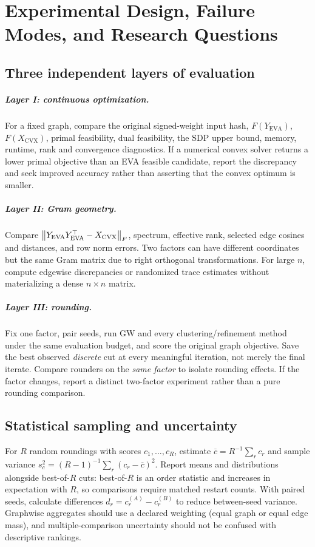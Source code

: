 \chapter{Experimental Design, Failure Modes, and Research Questions}\label{ch:protocol}
\section{Three independent layers of evaluation}
\paragraph{Layer I: continuous optimization.} For a fixed graph, compare the original signed-weight input hash, $F(Y_{\mathrm{EVA}})$, $F(X_{\mathrm{CVX}})$, primal feasibility, dual feasibility, the SDP upper bound, memory, runtime, rank and convergence diagnostics. If a numerical convex solver returns a lower primal objective than an EVA feasible candidate, report the discrepancy and seek improved accuracy rather than asserting that the convex optimum is smaller.

\paragraph{Layer II: Gram geometry.} Compare $\left\lVert Y_{\mathrm{EVA}}Y_{\mathrm{EVA}}^\top-X_{\mathrm{CVX}}\right\rVert_F$, spectrum, effective rank, selected edge cosines and distances, and row norm errors. Two factors can have different coordinates but the same Gram matrix due to right orthogonal transformations. For large $n$, compute edgewise discrepancies or randomized trace estimates without materializing a dense $n\times n$ matrix.

\paragraph{Layer III: rounding.} Fix one factor, pair seeds, run GW and every clustering/refinement method under the same evaluation budget, and score the original graph objective. Save the best observed \emph{discrete} cut at every meaningful iteration, not merely the final iterate. Compare rounders on the \emph{same factor} to isolate rounding effects. If the factor changes, report a distinct two-factor experiment rather than a pure rounding comparison.

\section{Statistical sampling and uncertainty}
For $R$ random roundings with scores $c_1,\ldots,c_R$, estimate $\overline c=R^{-1}\sum_rc_r$ and sample variance $s_c^2=(R-1)^{-1}\sum_r(c_r-\overline c)^2$. Report means and distributions alongside best-of-$R$ cuts: best-of-$R$ is an order statistic and increases in expectation with $R$, so comparisons require matched restart counts. With paired seeds, calculate differences $d_r=c_r^{(A)}-c_r^{(B)}$ to reduce between-seed variance. Graphwise aggregates should use a declared weighting (equal graph or equal edge mass), and multiple-comparison uncertainty should not be confused with descriptive rankings.

